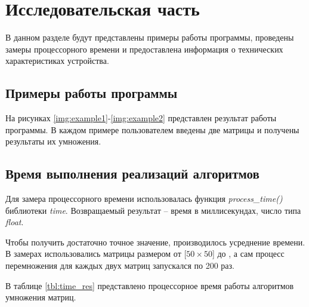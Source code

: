 \chapter{Исследовательская часть}

В данном разделе будут представлены примеры работы программы, проведены замеры процессорного времени и предоставлена информация о технических характеристиках устройства.

\section{Примеры работы программы}

На рисунках \ref{img:example1}-\ref{img:example2} представлен результат работы программы. В каждом примере пользователем введены две матрицы и получены результаты их умножения.

\clearpage


\section{Время выполнения реализаций алгоритмов}

Для замера процессорного времени использовалась функция \textit{process\_time()} библиотеки \textit{time}. Возвращаемый результат -- время в миллисекундах, число типа \textit{float}.

Чтобы получить достаточно точное значение, производилось усреднение времени. В замерах использовались матрицы размером от [$50\times 50$] до \newline [$450\times 450$], а сам процесс перемножения для каждых двух матриц запускался по 200 раз.

В таблице \ref{tbl:time_res} представлено процессорное время работы алгоритмов умножения матриц.

